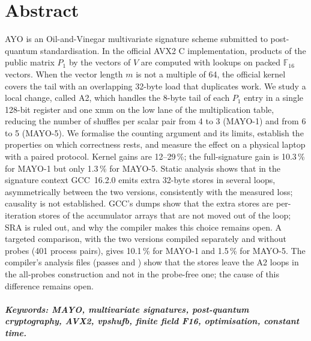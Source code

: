 \chapter*{Abstract}
\label{chap:abstract}
AYO is an Oil-and-Vinegar multivariate signature scheme submitted to post-quantum standardisation. In the official AVX2 C implementation, products of the public matrix $P_1$ by the vectors of $V$ are computed with  lookups on packed $\mathbb{F}_{16}$ vectors. When the vector length $m$ is not a multiple of 64, the official kernel covers the tail with an overlapping 32-byte load that duplicates work. We study a local change, called A2, which handles the 8-byte tail of each $P_1$ entry in a single 128-bit register and one xmm  on the low lane of the multiplication table, reducing the number of shuffles per scalar pair from 4 to 3 (MAYO-1) and from 6 to 5 (MAYO-5). We formalise the counting argument and its limits, establish the properties on which correctness rests, and measure the effect on a physical laptop with a paired protocol. Kernel gains are 12--29\,\%; the full-signature gain is 10.3\,\% for MAYO-1 but only 1.3\,\% for MAYO-5. Static analysis shows that in the signature context GCC~16.2.0 emits extra 32-byte stores in several loops, asymmetrically between the two versions, consistently with the measured loss; causality is not established. GCC's dumps show that the extra stores are per-iteration stores of the accumulator arrays that are not moved out of the loop; SRA is ruled out, and why the compiler makes this choice remains open. A targeted comparison, with the two versions compiled separately and without probes (401 process pairs), gives 10.1\,\% for MAYO-1 and 1.5\,\% for MAYO-5. The compiler's analysis files (passes  and ) show that the stores leave the A2 loops in the all-probes construction and not in the probe-free one; the cause of this difference remains open.

\paragraph{Keywords: MAYO, multivariate signatures, post-quantum cryptography, AVX2, vpshufb, finite field F16, optimisation, constant time.}
\clearpage

